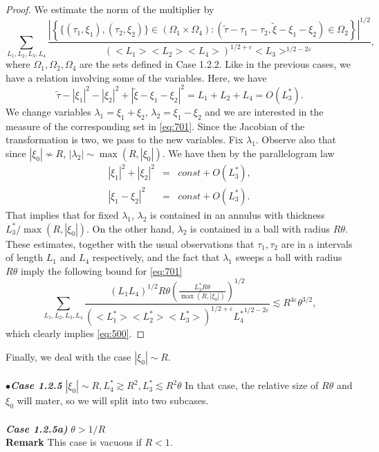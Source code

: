 \documentclass[draft,11pt,leqno]{amsart}
\newcommand{\ve}{\varepsilon}
\newcommand{\la}{\lambda}
\newcommand{\Om}{\Omega}
\newcommand{\suml}{\sum\limits}
\newcommand{\f}{\displaystyle\frac}
\newcommand{\lone}{{L_1^{*}}}
\newcommand{\ltwo}{{L_2^{*}}}
\newcommand{\lthree}{{L_3^{*}}}
\newcommand{\lfour}{{L_4^{*}}}
\begin{document}
\begin{proof}
We estimate the norm of the multiplier by
\begin{equation}
\label{eq:701}
 \suml_{L_1,L_2,L_3,L_4}\f{\left|
\left\{\{(\tau_1,\xi_1),(\tau_2,\xi_2)\}\in(\Om_1\times\Om_4):(\tilde{\tau}-\tau_1-\tau_2,
\tilde{\xi}-\xi_1-\xi_2)\in
\Om_2\right\}\right|^{1/2}}{(<L_1><L_2><L_4>)^{1/2+\ve}<L_3>^{1/2-2\ve}},
\end{equation}
where $\Om_1, \Om_2, \Om_4$ are the sets defined in Case 1.2.2.
Like in the previous cases, we have  a relation involving some of
the variables. Here, we have $$
\tilde{\tau}-|\xi_1|^2-|\xi_2|^2+|\tilde{\xi}-\xi_1-\xi_2|^2=L_1+L_2+L_4=O(\lthree).
$$ We change variables $\la_1=\xi_1+\xi_2$, $\la_2=\xi_1-\xi_2$
and we are interested in the measure of the corresponding set in
\eqref{eq:701}. Since the Jacobian of the transformation  is two,
we pass to the new variables. Fix $\la_1$. Observe also that since
$|\xi_0|\nsim R$, $|\la_2|\sim \max(R,|\xi_0|)$.  We have then by
the parallelogram law
\begin{eqnarray*}
|\xi_1|^2+|\xi_2|^2 &=& const+O(\lthree), \\ |\xi_1-\xi_2|^2 & =&
const+O(\lthree).
\end{eqnarray*}
That implies that for fixed $\la_1$, $\la_2$ is contained in an
annulus with thickness $\lthree/\max(R,|\xi_0|)$. On the other
hand, $\la_2$ is contained in a ball with radius $R\theta$. These
estimates, together with the usual observations that $\tau_1,
\tau_2$ are in a intervals of length $L_1$ and $L_4$ respectively,
and the fact that $\la_1$ sweeps a ball with radius $R\theta$
imply the following bound for \eqref{eq:701} $$ \suml_{L_1, L_2,
L_3, L_4} \f{(L_1L_4)^{1/2} R\theta \left(\f{\lthree
R\theta}{\max(R,|\xi_0|)}\right)^{1/2}}{(<\lone><\ltwo><\lthree>)^{1/2+\ve}\lfour^{1/2-2\ve}}
\lesssim R^{4\ve}\theta^{3/2}, $$
which clearly implies \eqref{eq:500}.
\end{proof}
Finally, we deal with the  case  $|\xi_0|\sim R$.\\\\
$\bullet${\it\bf Case 1.2.5} 
$|\xi_0|\sim R, \lfour\gtrsim R^2, \lthree\lesssim  R^2\theta$ \newline
In that case, the relative size of $R\theta$ and $\xi_0$ will mater, so we will split into two subcases.\\\\
{\it\bf Case 1.2.5a)} $\theta>1/R$\\
{\bf Remark} This case is vacuous if $R<1$.
\end{document}

